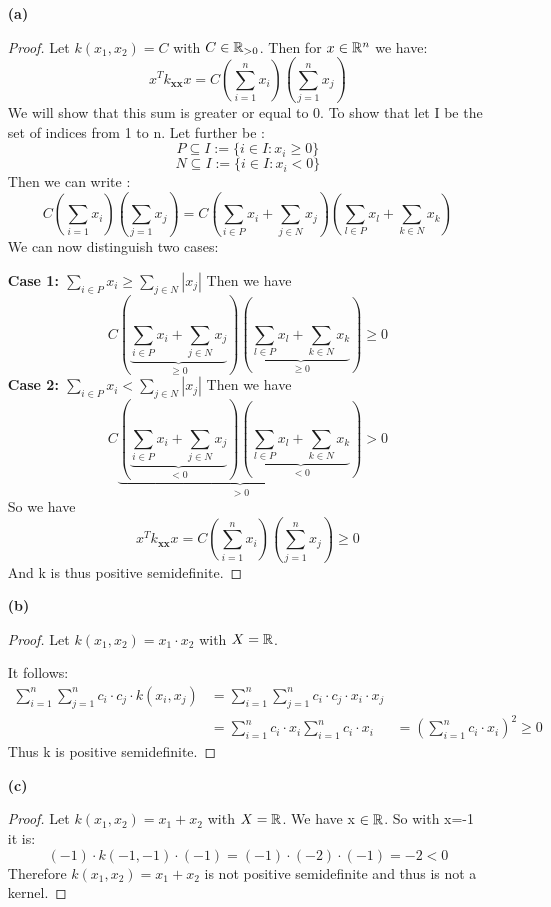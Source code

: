 \begin{itemize}
    \item[\textbf{(a)}] 
    \begin{proof} 
        Let $k(x_1,x_2)= C$ with $C \in \mathbb{R}_{>0}$.  Then for $x \in \mathbb{R}^n$ we have:
    \[
    x^T k_{\textbf{xx}}x = C(\sum_{i=1}^nx_i)(\sum_{j=1}^nx_j)    
    \]
    We will show that this sum is greater or equal to 0. To show that let I be the set of indices from 1 to n. Let further be :
    \[
    P \subseteq I := \{i\in I : x_i \geq 0 \}   
    \]
    \[
    N \subseteq I := \{i\in I : x_i < 0 \}   
    \]
    Then we can write :
    \[
        C(\sum_{i=1}x_i)(\sum_{j=1}x_j)  =   C(\sum_{i \in P}x_i+ \sum_{j \in N}x_j)(\sum_{l \in P}x_l+ \sum_{k \in N}x_k)  
    \]
    We can now distinguish two cases:

    \textbf{Case 1: $\sum_{i\in P} x_i \geq \sum_{j \in N} |x_j|$}
    Then we have 
    \[
        C(\underbrace{\sum_{i \in P}x_i+ \sum_{j \in N}x_j}_{\geq 0})(\underbrace{\sum_{l \in P}x_l+ \sum_{k \in N}x_k}_{\geq 0}) \geq 0    
    \]
    \textbf{Case 2: $\sum_{i\in P} x_i < \sum_{j \in N} |x_j|$}
    Then we have 
    \[
        C \underbrace{(\underbrace{\sum_{i \in P}x_i+ \sum_{j \in N}x_j}_{< 0})(\underbrace{\sum_{l \in P}x_l+ \sum_{k \in N}x_k}_{< 0})}_{>0} > 0    
    \]
    So we have 
    \[
        x^T k_{\textbf{xx}}x = C(\sum_{i=1}^nx_i)(\sum_{j=1}^nx_j) \geq 0
    \]
    And k is thus positive semidefinite.
    \end{proof}
    
     \item[\textbf{(b)}] 
    		\begin{proof} 
    			Let $k(x_1,x_2)= x_1 \cdot x_2$ with $X = \mathbb{R}$. 
    			
    			It follows:
    				\begin{align*}
    					\sum_{i=1}^n\sum_{j=1}^n c_i \cdot c_j \cdot k(x_i, x_j) 
    					&=\sum_{i=1}^n\sum_{j=1}^n c_i \cdot c_j \cdot x_i \cdot x_j\\
    					&=\sum_{i=1}^n c_i \cdot x_i \sum_{i=1}^n c_i\cdot x_i 
    					&=(\sum_{i=1}^n c_i \cdot x_i)^2 \geq 0
    				\end{align*}
    				Thus k is positive semidefinite.
     	\end{proof}
     	
     	\item[\textbf{(c)}] 
    		\begin{proof}
    			Let $k(x_1,x_2)= x_1 + x_2$ with $X = \mathbb{R}$. 
    			We have x $\in \mathbb{R}$.  So with x=-1 it is:
    			\[(-1) \cdot k(-1,-1) \cdot (-1) = (-1) \cdot (-2) \cdot (-1) = -2 < 0\]
    			Therefore $k(x_1,x_2)= x_1 + x_2$ is not positive semidefinite and thus is not a kernel.
    		\end{proof}
    		

\end{itemize}
